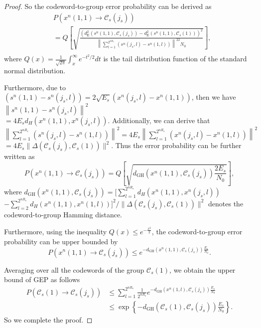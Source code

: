 \documentclass[12pt, draftclsnofoot,onecolumn]{IEEEtran}
\begin{document}
\begin{proof}
So the codeword-to-group error probability can be derived as
\begin{equation}
\begin{aligned}
  &P\left(x^n(1,1)\to{\mathcal{C}_s}(j_s)\right)\\
  &= Q\left[ \sqrt {\frac{(d_{\text{E}}^2 \left(s^n(1,1), \mathcal{C}_s(j_s)\right)-d_{\text{E}}^2 \left(s^n(1,1), \mathcal{C}_s(1)\right))^2}{\left\|\sum_{l=1}^{2^{nR_s}} \left(s^n(j_s,l)-s^n(1,l)\right)\right\|^22N_0}} \right], \\
\end{aligned}
\end{equation}
where $Q(x)=\frac{1}{\sqrt{2\pi}}\int_x^{\infty} e^{-t^2/2}dt$ is the tail distribution function of the standard normal distribution.

Furthermore, due to $\left(s^n(1,1)-s^n(j_s,l)\right)=2\sqrt{E_s}\left(x^n(j_s,l)-x^n(1,1)\right)$, then we have ${\left\| s^n(1,1)-s^n(j_s,l) \right\|}^2$\\$=4 E_s d_H(x^n(1,1),x^n(j_s,l))$. Additionally, we can derive that $\left\|\sum_{l=1}^{2^{nR_s}} \left(s^n(j_s,l)-s^n(1,l)\right)\right\|^2=4 E_s\left\|\sum_{l=1}^{2^{nR_s}} \left(x^n(j_s,l)-x^n(1,l)\right)\right\|^2$$=4 E_s\|\Delta(\mathcal{C}_s(j_s),\mathcal{C}_s(1))\|^2$. Thus the error probability can be further written as
\begin{equation}
  P\left(x^n(1,1)\to{\mathcal{C}_s}(j_s)\right)= Q\left[ \sqrt {d_\text{GH}(x^n(1,1),\mathcal{C}_s(j_s)) \frac{2E_s}{N_0}} \right],
\end{equation}
where $d_\text{GH}(x^n(1,1),\mathcal{C}_s(j_s))=$$[\sum_{l=1}^{2^{nR_s}} d_H(x^n(1,1),x^n(j_s,l))$\\$-\sum_{l=2}^{2^{nR_s}} d_H( x^n(1,1),x^n(1,l))]^2$$/\|\Delta(\mathcal{C}_s(j_s),\mathcal{C}_s(1))\|^2$ denotes the codeword-to-group Hamming distance.

Furthermore, using the inequality $Q(x)\leq e^{-\frac{x^2}{2}}$, the codeword-to-group error probability can be upper bounded by
\begin{equation}
P\left(x^n(1,1)\to{\mathcal{C}_s}(j_s)\right) \leq e^ {-d_\text{GH}(x^n(1,1),\mathcal{C}_s(j_s)) \frac{E_s}{N_0}}.
\end{equation}

Averaging over all the codewords of the group $\mathcal{C}_s(1)$, we obtain the upper bound of GEP as follows
\begin{equation}
\begin{aligned}
P\left({\mathcal{C}_s}(1)\to{\mathcal{C}_s}(j_s)\right) &\leq \sum_{l=1}^{2^{nR_s}} \frac{1}{2^{nR_s}}e^{-d_\text{GH}(x^n(1,l),\mathcal{C}_s(j_s)) \frac{E_s}{N_0}}\\
& \leq \exp\left\{-d_\text{GH}(\mathcal{C}_s(1),\mathcal{C}_s(j_s)) \frac{E_s}{N_0}\right\}.
\end{aligned}
\end{equation}
So we complete the proof.
\end{proof}
\end{document}
